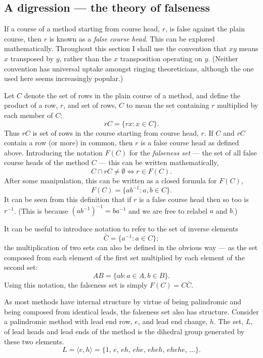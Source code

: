\documentclass[a4paper,11pt,oneside]{book}
\def\textitidx#1{\textit{#1}\index{#1}}
\begin{document}
\subsection{A digression — the theory of falseness}%
\label{falsetheo}

If a course of a method starting from course head, $r$, is false against the 
plain course, then $r$ is known as a \textitidx{false course head}.  This 
can be explored mathematically.  Throughout this section I shall use the
convention that $xy$ means $x$ transposed by $y$, rather than the $x$ 
transposition operating on $y$.  (Neither convention has universal uptake
amongst ringing theoreticians, although the one used here seems increasingly
popular.)

Let $C$ denote the set of rows in the plain course of a method, 
and define the product of a row, $r$, and set of rows, $C$ to mean 
the set containing $r$ multiplied by each member of $C$:
\[ rC = \{ r x : x \in C \}. \]
Thus $rC$ is set of rows in the course starting from course head, $r$.
If $C$ and $rC$ contain a row (or more) in common, then $r$ is a false 
course head as defined above.  Introducing the notation $F(C)$ for the 
\textitidx{falseness set} 
--- the set of all false course heads of the method $C$ --- 
this can be written mathematically,
\[ C \cap rC \ne \emptyset \iff r \in F(C). \]
After some manipulation, this can be written as a closed formula for $F(C)$,
\[ F(C) = \{ a b^{-1} : a, b \in C \}. \]
It can be seen from this definition that if $r$ is a false course head then
so too is $r^{-1}$.  (This is because $(a b^{-1})^{-1} = b a^{-1}$ and we
are free to relabel $a$ and $b$.)

It can be useful to introduce notation to refer to the set of 
inverse elements
\[ \bar{C} = \{ a^{-1} : a \in C \}; \]
the multiplication of two sets can also be defined in the obvious way 
--- as the set composed from each element of the first set multiplied by each 
element of the second set:
\[ AB = \{ a b : a \in A, b \in B \}. \]
Using this notation, the falseness set is simply $F(C) = C\bar{C}$.

As most methods have internal structure by virtue of being palindromic%
 and being composed from identical leads, 
the falseness set also has structure.  
Consider a palindromic method with lead end row, $e$, and lead end change, $h$.
The set, $L$, of lead heads and lead ends of the method is the 
dihedral group generated by these two elements.
\[ L = \langle e, h \rangle 
     = \{ 1,\, e,\, eh,\, ehe,\, eheh,\, ehehe,\, \ldots \}. \]
\end{document}
